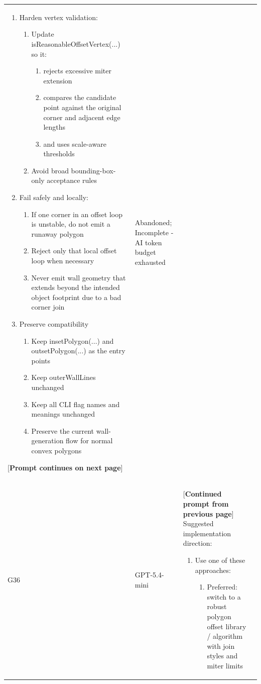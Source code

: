 \documentclass[10pt,twocolumn,a4paper]{article}
\begin{document}
\begin{longtable}{@{}p{0.6cm}p{1.5cm}p{11.0cm}p{2.7cm}@{}}
\begin{enumerate}
	\item{Harden vertex validation:}
	\begin{enumerate}
		\item{Update isReasonableOffsetVertex(...) so it:}
		\begin{enumerate}
			\item{rejects excessive miter extension}
			\item{compares the candidate point against the original corner and adjacent edge lengths}
			\item{and uses scale-aware thresholds} 
		\end{enumerate}
		\item{Avoid broad bounding-box-only acceptance rules}
	\end{enumerate}
	\item{Fail safely and locally:}
	\begin{enumerate}
		\item{If one corner in an offset loop is unstable, do not emit a runaway polygon}
		\item{Reject only that local offset loop when necessary}
		\item{Never emit wall geometry that extends beyond the intended object footprint due to a bad corner join} 
	\end{enumerate}
	\item{Preserve compatibility}
	\begin{enumerate}
		\item{Keep insetPolygon(...) and outsetPolygon(...) as the entry points}
		\item{Keep outerWallLines unchanged}
		\item{Keep all CLI flag names and meanings unchanged}
		\item{Preserve the current wall-generation flow for normal convex polygons} 
	\end{enumerate}
\end{enumerate}
[\textbf{Prompt continues on next page}] & Abandoned; Incomplete - AI token budget exhausted \\
\addlinespace
G36 & GPT-5.4-mini & [\textbf{Continued prompt from previous page}] \newline
Suggested implementation direction:
\begin{enumerate}
	\item{Use one of these approaches:}
	\begin{enumerate}
		\item{Preferred: switch to a robust polygon offset library / algorithm with join styles and miter limits} 

\end{enumerate}
\end{enumerate}
\end{longtable}
\end{document}
